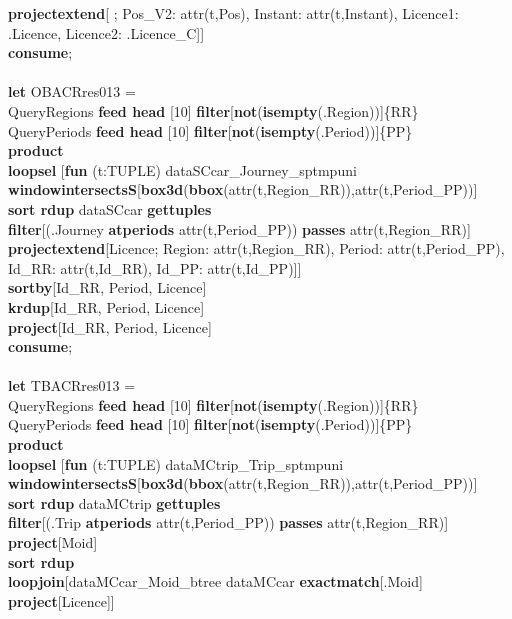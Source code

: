 \documentclass[a4paper]{article}
\newcommand{\op}[1]{\textbf{#1}}
\begin{document}
\begin{scriptsize}
\begin{tabbing}
\>\>\op{projectextend}[ ; Pos\_V2: attr(t,Pos), Instant: attr(t,Instant), Licence1: .Licence, Licence2: .Licence\_C]]\\
\op{consume};\\
\\
\op{let} OBACRres013 =\\
\>QueryRegions \op{feed head} [10] \op{filter}[\op{not}(\op{isempty}(.Region))]\{RR\}\\
\>QueryPeriods \op{feed head} [10] \op{filter}[\op{not}(\op{isempty}(.Period))]\{PP\}\\
\>\op{product}\\
\>\op{loopsel} [\op{fun} (t:TUPLE) dataSCcar\_Journey\_sptmpuni  \op{windowintersectsS}[\op{box3d}(\op{bbox}(attr(t,Region\_RR)),attr(t,Period\_PP))]\\
\>\>\op{sort rdup} dataSCcar  \op{gettuples}\\
\>\>\op{filter}[(.Journey \op{atperiods} attr(t,Period\_PP)) \op{passes} attr(t,Region\_RR)]\\
\>\>\op{projectextend}[Licence; Region: attr(t,Region\_RR), Period: attr(t,Period\_PP), Id\_RR: attr(t,Id\_RR), Id\_PP: attr(t,Id\_PP)]]\\
\>\op{sortby}[Id\_RR, Period, Licence]\\
\>\op{krdup}[Id\_RR, Period, Licence]\\
\>\op{project}[Id\_RR, Period, Licence]\\
\op{consume};\\
\\
\op{let} TBACRres013 =\\
\>QueryRegions \op{feed head} [10] \op{filter}[\op{not}(\op{isempty}(.Region))]\{RR\}\\
\>QueryPeriods \op{feed head} [10] \op{filter}[\op{not}(\op{isempty}(.Period))]\{PP\}\\
\>\op{product}\\
\>\op{loopsel} [\op{fun} (t:TUPLE) dataMCtrip\_Trip\_sptmpuni \op{windowintersectsS}[\op{box3d}(\op{bbox}(attr(t,Region\_RR)),attr(t,Period\_PP))]\\
\>\>\op{sort rdup} dataMCtrip \op{gettuples}\\
\>\>\op{filter}[(.Trip \op{atperiods} attr(t,Period\_PP)) \op{passes} attr(t,Region\_RR)]\\
\>\>\op{project}[Moid]\\
\>\>\op{sort rdup}\\
\>\>\op{loopjoin}[dataMCcar\_Moid\_btree dataMCcar \op{exactmatch}[.Moid] \op{project}[Licence]]\\

\end{tabbing}
\end{scriptsize}
\end{document}
